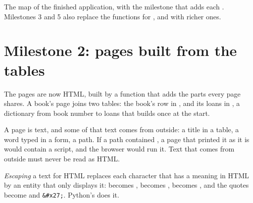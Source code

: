 \begin{omfigure}

{\small The  map of the finished application, with the milestone that adds each . Milestones 3 and 5
also replace the functions for , \code{/} and  with richer ones.}
\end{omfigure}

\section{Milestone 2: pages built from the tables}\label{sec:g10:project-web-application:m2}

The pages are now HTML, built by a function  that adds the parts every page shares. A book's
page joins two tables: the book's row in , and its loans in , a dictionary from book number
to loans that  builds once at the start.

A page is text, and some of that text comes from outside: a title in a table, a word typed in a form, a path. If a
path contained , a page that printed it as it is would contain a script, and the browser would run
it. Text that comes from outside must never be read as HTML.

\begin{definition}[Escaping]\label{def:g10:project-web-application:escaping}
\emph{Escaping} a text for HTML replaces each character that has a meaning in HTML by an
entity that only displays it: \code{<} becomes , \code{>} becomes , \code{&} becomes
, and the quotes become  and \texttt{\&\#x27;}. Python's  does it.
\end{definition}

